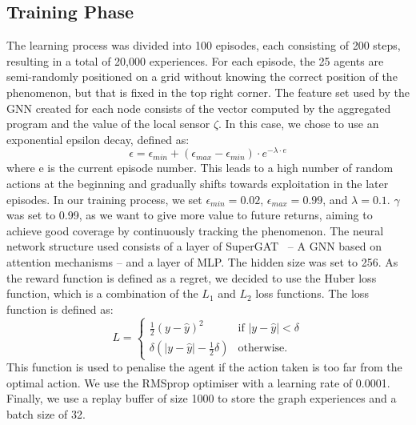 \documentclass[conference]{IEEEtran}
\begin{document}
\subsection{Training Phase}
The learning process was divided into 100 episodes, each consisting of 200 steps, resulting in a total of 20,000 experiences.
%
For each episode, 
 the 25 agents are semi-randomly  positioned on a grid without knowing the correct position of the phenomenon, 
 but that is fixed in the top right corner.  
 The feature set used by the \ac{GNN} created for each node consists of the vector computed by the aggregated program and the value of the local sensor $\zeta$.
%
In this case, we chose to use an exponential epsilon decay, defined as:
\begin{equation*}
\epsilon = \epsilon_{min} + (\epsilon_{max} - \epsilon_{min}) \cdot e^{-\lambda \cdot e}
\end{equation*}
where e is the current episode number. 
This leads to a high number of random actions at the beginning and gradually shifts towards exploitation in the later episodes. 
%
In our training process, 
 we set $\epsilon_{min} = 0.02$, $\epsilon_{max} = 0.99$, and $\lambda = 0.1$.
$\gamma$ was set to 0.99, 
 as we want to give more value to future returns, 
 aiming to achieve good coverage by continuously tracking the phenomenon. 
The neural network structure used consists of a layer of SuperGAT~\cite{DBLP:journals/corr/abs-2204-04879} -- A \ac{GNN} based on attention mechanisms -- and a layer of MLP. 
The hidden size was set to 256.
%
As the reward function is defined as a regret, 
 we decided to use the Huber loss function, %
 which is a combination of the $L_1$ and $L_2$ loss functions.
%
The loss function is defined as:
\begin{equation*}
L = \begin{cases}
  \frac{1}{2} (y - \hat{y})^2 & \text{if } |y - \hat{y}| < \delta \\
  \delta (|y - \hat{y}| - \frac{1}{2} \delta) & \text{otherwise.} 
 \end{cases}
\end{equation*}
This function is used to penalise the agent if the action taken is too far from the optimal action. 
%
We use the RMSprop optimiser with a learning rate of 0.0001.
%
Finally, we use a replay buffer of size 1000 to store the graph experiences and a batch size of 32.
\end{document}
